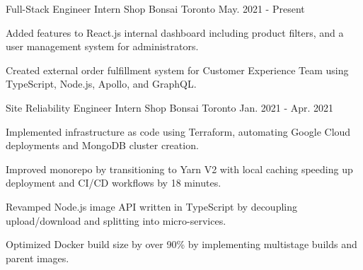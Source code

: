 

\begin{cventries}

  \cventry
    {Full-Stack Engineer Intern} %
    {Shop Bonsai} %
    {Toronto} %
    {May. 2021 - Present} %
    {
      \begin{cvitems} %
        \item {Added features to React.js internal dashboard including product filters, and a user management system for administrators.}
        \item {Created external order fulfillment system for Customer Experience Team using TypeScript, Node.js, Apollo, and GraphQL.}
      \end{cvitems}
    }
    
  \cventry
    {Site Reliability Engineer Intern} %
    {Shop Bonsai} %
    {Toronto} %
    {Jan. 2021 - Apr. 2021} %
    {
      \begin{cvitems} %
        \item {Implemented infrastructure as code using Terraform, automating Google Cloud deployments and MongoDB cluster creation.}
        \item {Improved monorepo by transitioning to Yarn V2 with local caching speeding up deployment and CI/CD workflows by 18 minutes.}
        \item {Revamped Node.js image API written in TypeScript by decoupling upload/download and splitting into micro-services.}
        \item {Optimized Docker build size by over 90\% by implementing multistage builds and parent images.}
      \end{cvitems}
    }
    
\end{cventries}
